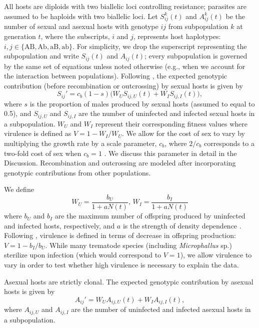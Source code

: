 \documentclass{article}\usepackage[]{graphicx}\usepackage[]{color}
\begin{document}
All hosts are diploids with two biallelic loci controlling resistance; parasites are assumed to be haploids with two biallelic loci.
Let $S_{ij}^k(t)$ and $A_{ij}^k(t)$ be the number of sexual and asexual hosts with genotype $ij$ from subpopulation $k$ at generation $t$, 
where the subscripts, $i$ and $j$, represents host haplotypes: $i, j \in \{\mathrm{AB}, \mathrm{Ab}, \mathrm{aB}, \mathrm{ab}\}$.
For simplicity, we drop the superscript representing the subpopulation and write $S_{ij}(t)$ and $A_{ij}(t)$;
every subpopulation is governed by the same set of equations unless noted otherwise (e.g., when we account for the interaction between populations).
Following \cite{lively2010epidemiological}, the expected genotypic contribution (before recombination or outcrossing) by sexual hosts is given by
\begin{equation}
S_{ij}' = c_b (1-s) \bigg(W_U S_{ij,U} (t) + W_I S_{ij,I} (t)\bigg),
\end{equation}
where $s$ is the proportion of males produced by sexual hosts (assumed to equal to 0.5), and $S_{ij, U}$ and $S_{ij,I}$ are the number of uninfected and infected sexual hosts in a subpopulation.
$W_U$ and $W_I$ represent their corresponding fitness values where virulence is defined as $V = 1-W_I/W_U$.
We allow for the cost of sex to vary by multiplying the growth rate by a scale parameter, $c_b$, where $2/c_b$ corresponds to a two-fold cost of sex when $c_b = 1$ \citep{ashby2015diversity}. 
We discuss this parameter in detail in the Discussion.
Recombination and outcrossing are modeled after incorporating genotypic contributions from other populations.

We define
$$
W_U = \frac{b_U}{1 + a N(t)},\,  W_I = \frac{b_I}{1 + a N(t)}
$$
where $b_U$ and $b_I$ are the maximum number of offspring produced by uninfected and infected hosts, respectively, and $a$ is the strength of density dependence \citep{smith1973stability, lively2010epidemiological}.
Following \cite{lively2010epidemiological}, virulence is defined in terms of decrease in offspring production: $V = 1- b_I/b_U$.
While many trematode species (including \textit{Microphallus} sp.) sterilize upon 
infection (which would correspond to $V = 1$), we allow virulence to vary
in order to test whether high virulence is necessary to explain the data.

Asexual hosts are strictly clonal.
The expected genotypic contribution by asexual hosts is given by
\begin{equation}
A_{ij}' = W_U A_{ij,U} (t) + W_I A_{ij,I} (t),
\end{equation}
where $A_{ij, U}$ and $A_{ij,I}$ are the number of uninfected and infected asexual hosts in a subpopulation.
\end{document}
